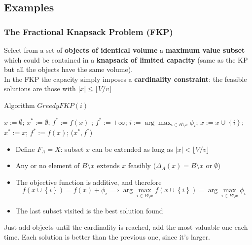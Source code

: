 \newpage

\subsection{Examples}
\subsubsection{The Fractional Knapsack Problem (FKP)}
Select from a set of \textbf{objects of identical volume} a \textbf{maximum value subset} which could be contained in a \textbf{knapsack of limited capacity} (same as the KP but all the objects have the same volume).\\

In the FKP the capacity simply imposes a \textbf{cardinality constraint}: the feasible solutions are those with $|x| \leq \lfloor V / v \rfloor$

\begin{algorithm}
	\caption{Algorithm $GreedyFKP(i)$}
	\begin{algorithmic}
		\STATE $x := \emptyset$; $x^\ast := \emptyset$;
		\STATE $f^\ast := f(x)$ ;
		\ELSE
		\STATE $f^\ast := + \infty$;
		\ENDIF
		\STATE $i:= \arg \max_{i \in B \setminus x} \phi_i$;
		\STATE $x := x \cup \left\{i\right\}$;
		\STATE $x^\ast := x$; $f^\ast := f(x)$;
		\ENDIF
		\ENDWHILE
		\RETURN ($x^\ast, f^\ast$)
	\end{algorithmic}
\end{algorithm}

\begin{itemize}
	\item Define $F_A = X$: subset $x$ can be extended as long as $|x| < \lfloor V/v \rfloor$
	\item Any or no element of $B \setminus x$ extends $x$ feasibly ($\Delta_A (x) = B \setminus x$ or $\emptyset$)
	\item The objective function is additive, and therefore
	$$ f(x \cup \left\{i\right\}) = f(x) + \phi_i \implies \arg \max_{i \in B \setminus x} f(x \cup \left\{i\right\}) = \arg \max_{i \in B \setminus x} \phi_i $$
	\item The last subset visited is the best solution found
\end{itemize}
Just add objects until the cardinality is reached, add the most valuable one each time. Each solution is better than the previous one, since it's larger.\\

